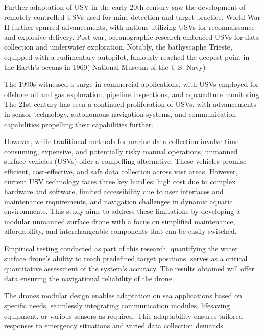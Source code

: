  Further adaptation of USV in the early 20th century saw the development of remotely controlled USVs used for mine detection and target 
            practice. World War II further spurred advancements, with nations utilizing USVs for reconnaissance and explosive delivery. Post-war, 
            oceanographic research embraced USVs for data collection and underwater exploration. Notably, the bathyscaphe Trieste, equipped with a 
            rudimentary autopilot, famously reached the deepest point in the Earth's oceans in 1960( National Museum of the U.S. Navy)
          
 The 1990s witnessed a surge in commercial applications, with USVs employed for offshore oil and gas exploration, pipeline inspections, and 
            aquaculture monitoring. The 21st century has seen a continued proliferation of USVs, with advancements in sensor technology, autonomous 
            navigation systems, and communication capabilities propelling their capabilities further.

 However, while traditional methods for marine data collection involve time-consuming, expensive, and potentially risky manual operations,
            unmanned surface vehicles (USVs) offer a compelling alternative. These vehicles promise efficient, cost-effective, and safe data collection 
            across vast areas. However, current USV technology faces three key hurdles: high cost due to complex hardware and software, limited 
            accessibility due to user interfaces and maintenance requirements, and navigation challenges in dynamic aquatic environments. This study aims 
            to address these limitations by developing a modular unmanned surface drone with a focus on simplified maintenance, affordability, and 
            interchangeable components that can be easily switched.

 Empirical testing conducted as part of this research, quantifying the water surface drone's ability to reach predefined target positions, 
            serves as a critical quantitative assessment of the system's accuracy. The results obtained will offer data ensuring the navigational 
            reliability of the drone.

 The drones modular design enables adaptation on sea applications based on specific needs, seamlessly integrating communication modules, 
            lifesaving equipment, or various sensors as required. This adaptability ensures tailored responses to emergency situations and varied data 
            collection demands. 


